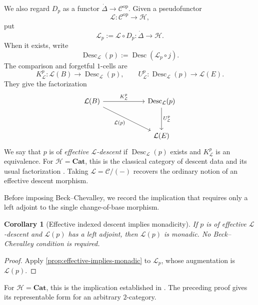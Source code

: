 \documentclass[11pt,a4paper]{article}
\numberwithin{equation}{section}
\newtheorem{corollary}[corollary]{Corollary}
\theoremstyle{definition}
\theoremstyle{remark}
\newcommand{\Hcat}{\mathcal H}
\newcommand{\C}{\mathcal C}
\newcommand{\Lx}{\mathcal L}
\newcommand{\Cat}{\mathbf{Cat}}
\newcommand{\Desc}{\operatorname{Desc}}
\begin{document}
We also regard $D_p$ as a functor
$\dot\Delta\to\C^{\mathrm{op}}$. Given a pseudofunctor
\begin{equation}
  \Lx\colon\C^{\mathrm{op}}\longrightarrow\Hcat,
  \label{eq:indexed-pseudofunctor}
\end{equation}
put
\begin{equation}
  \Lx_p:=\Lx\circ D_p\colon\dot\Delta\longrightarrow\Hcat.
  \label{eq:indexed-cech-object}
\end{equation}
When it exists, write
\[
  \Desc_{\Lx}(p):=\Desc(\Lx_p\circ j).
\]
The comparison and forgetful $1$-cells are
\begin{equation}
  K_{\Lx}^{p}\colon\Lx(B)\longrightarrow\Desc_{\Lx}(p),
  \qquad
  U_{\Lx}^{p}\colon\Desc_{\Lx}(p)\longrightarrow\Lx(E).
  \label{eq:indexed-comparison-forgetful}
\end{equation}
They give the factorization
\begin{equation}
\begin{tikzcd}[column sep=6.0em,row sep=3.2em]
  \Lx(B) \ar[r,"K_{\Lx}^{p}"] \ar[dr,"\Lx(p)"']
  & \Desc_{\Lx}(p) \ar[d,"U_{\Lx}^{p}"]
  \\
  & \Lx(E)
\end{tikzcd}
\label{eq:indexed-descent-factorization}
\end{equation}
We say that $p$ is of \emph{effective $\Lx$-descent} if
$\Desc_{\Lx}(p)$ exists and $K_{\Lx}^{p}$ is an equivalence. For
$\Hcat=\Cat$, this is the classical category of descent data and its
usual factorization \cite{JanelidzeTholen1997,Nunes2018}. Taking
$\Lx=\C/(-)$ recovers the ordinary notion of an effective descent
morphism.

Before imposing Beck--Chevalley, we record the implication that
requires only a left adjoint to the single change-of-base morphism.

\begin{corollary}[Effective indexed descent implies monadicity]
\label{cor:indexed-effective-monadic}
If $p$ is of effective $\Lx$-descent and $\Lx(p)$ has a left
adjoint, then $\Lx(p)$ is monadic. No Beck--Chevalley condition is
required.
\end{corollary}

\begin{proof}
Apply \cref{prop:effective-implies-monadic} to $\Lx_p$, whose
augmentation is $\Lx(p)$.
\end{proof}

For $\Hcat=\Cat$, this is the implication established in
\cite[Theorem~4.7]{Nunes2021}. The preceding proof gives its
representable form for an arbitrary $2$-category.
\end{document}
